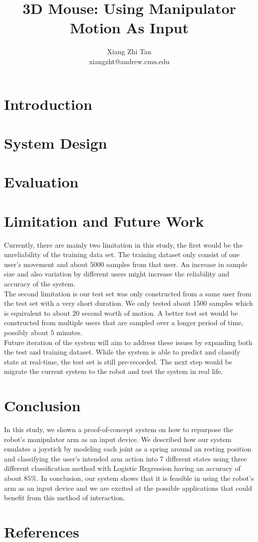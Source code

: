 \documentclass[11pt]{article}
\begin{document}
\title{3D Mouse: Using Manipulator Motion As Input}
\author{Xiang Zhi Tan\\ xiangzht@andrew.cmu.edu}
\maketitle

\section{Introduction}

\section{System Design}

\section{Evaluation}

\section{Limitation and Future Work}
Currently, there are mainly two limitation in this study, the first would be the unreliability of the training data set. The training dataset only consist of one user's movement and about 5000 samples from that user. An increase in sample size and also variation by different users might increase the reliability and accuracy of the system.\\
The second limitation is our test set was only constructed from a same user from the test set with a very short duration. We only tested about 1500 samples which is equivalent to about 20 second worth of motion. A better test set would be constructed from multiple users that are sampled over a longer period of time, possibly about 5 minutes.\\
Future iteration of the system will aim to address these issues by expanding both the test and training dataset. While the system is able to predict and classify state at real-time, the test set is still pre-recorded. The next step would be migrate the current system to the robot and test the system in real life.

\section{Conclusion}
In this study, we shown a proof-of-concept system on how to repurpose the robot's manipulator arm as an input device. We described how our system emulates a joystick by modeling each joint as a spring around an resting position and classifying the user's intended arm action into 7 different states using three different classification method with Logistic Regression having an accuracy of about $85\%$. In conclusion, our system shows that it is feasible in using the robot's arm as an input device and we are excited at the possible applications that could benefit from this method of interaction.

\section{References}
\begingroup
\renewcommand{\section}[2]{}%

\endgroup
\end{document}
